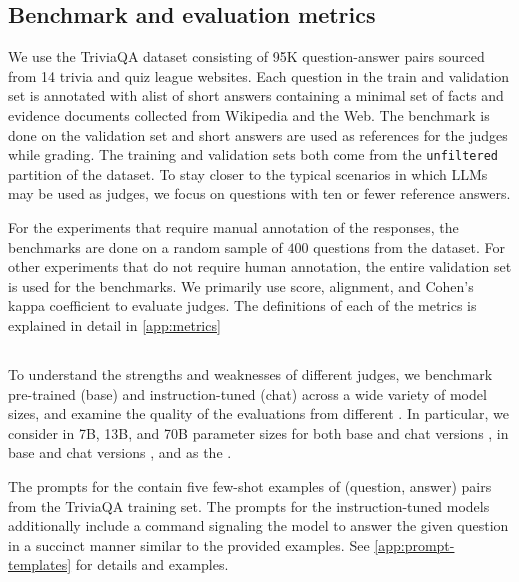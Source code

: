 \subsection{Benchmark and evaluation metrics} 
\label{sec:experiments:benchmark}
We use the TriviaQA  dataset\citep{joshi2017triviaqa} consisting of 95K question-answer pairs sourced from 14 trivia and quiz league websites. 
%
Each question in the train and validation set is annotated with alist of short answers containing a minimal set of facts and evidence documents collected from Wikipedia and the Web.
The benchmark is done on the validation set and short answers are used as references for the judges while grading. 
The training and validation sets both come from the \texttt{unfiltered} partition of the dataset.
%
To stay closer to the typical scenarios in which LLMs may be used as judges, we focus on questions with ten or fewer reference answers.

For the experiments that require manual annotation of the \evaluatormodel responses, the benchmarks are done on a random sample of $400$ questions from the dataset.
%
For other experiments that do not require human annotation, the entire validation set is used for the benchmarks.
%
We primarily use score, alignment, and Cohen's kappa coefficient to evaluate judges. The definitions of each of the metrics is explained in detail in \cref{app:metrics}
%  

\subsection{\Evaluatormodels} \label{sec:experiments:evaluationmodel}
To understand the strengths and weaknesses of different judges, we benchmark pre-trained (base) and instruction-tuned (chat) \evaluatormodels across a wide variety of model sizes, and examine the quality of the evaluations from different \judgemodels.
In particular, we consider  in 7B, 13B, and 70B parameter sizes for both base and chat versions \citep{touvron2023llama},  in base and chat versions \citep{jiang2023mistral}, and  \citep{achiam2023gpt} as the \evaluatormodels. 

The prompts for the \evaluatormodels contain five few-shot examples of (question, answer) pairs from the TriviaQA training set.
%
The prompts for the instruction-tuned models additionally include a command signaling the model to answer the given question in a succinct manner similar to the provided examples.
%
See \cref{app:prompt-templates} for details and examples.

